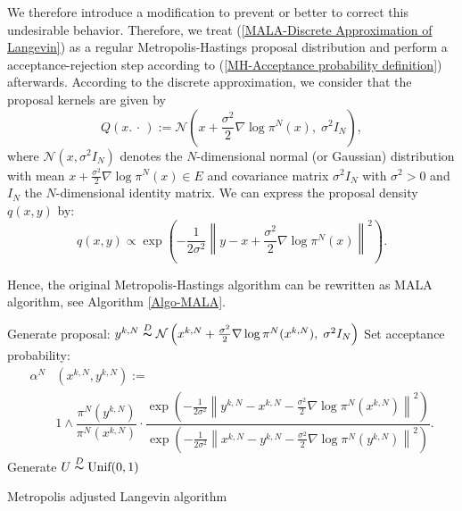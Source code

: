We therefore introduce a modification to prevent or better to correct this undesirable behavior. Therefore, we treat (\ref{MALA-Discrete Approximation of Langevin}) as a regular Metropolis-Hastings proposal distribution and perform a acceptance-rejection step according to (\ref{MH-Acceptance probability definition}) afterwards. According to the discrete approximation, we consider that the proposal kernels are given by
\begin{equation}
\label{MALA-GaussianProposalKernel}
 Q(x. \, \cdot \,) := \mathcal{N}(x + \frac{\sigma^2}{2} \nabla \log \pi^{N} \left( x \right),\; \sigma^2 I_{N} ),
\end{equation}
where $ \mathcal{N}(x, \sigma^2 I_{N} ) $ denotes the $N$-dimensional normal (or Gaussian) distribution with mean $x + \frac{\sigma^2}{2} \nabla \log \pi^{N} \left( x \right) \in E$ and covariance matrix $ \sigma^2 I_{N} $ with $ \sigma^2 > 0 $ and $ I_{N} $ the $N$-dimensional identity matrix. We can express the proposal density $ q(x,y) $ by:
\begin{equation}
 q(x,y)  \varpropto  \exp{ \left( - \frac{ 1}{2 \sigma^2}  \left\| y - x + \frac{\sigma^2}{2} \nabla \log \pi^{N} \left( x \right) \right\|^2 \right) }.
\end{equation}

Hence, the original Metropolis-Hastings algorithm can be rewritten as MALA algorithm, see Algorithm \ref{Algo-MALA}.

\IncMargin{1em}
\begin{algorithm}[htb]
\DontPrintSemicolon


\BlankLine

{
  Generate proposal: $ y^{k,N} \stackrel{D}{\thicksim} \mathcal{N}\left(x^{k,N} + \frac{\sigma^2}{2} \nabla \log \pi^{N}(x^{k,N}), \; \sigma^2 I_N\right) $\;
  Set acceptance probability:
  \begin{align*}
   \alpha^{N} & ( x^{k,N}, y^{k,N} )  := \\ 
   & 1 \wedge  \dfrac{\pi^{N}(y^{k,N}) }{\pi^{N}(x^{k,N})} \cdot
    \dfrac{ \exp{\left( - \frac{1}{2\sigma^2} \left\| y^{k,N} - x^{k,N} - \frac{\sigma^2}{2} \nabla \log \pi^{N}(x^{k,N}) \right\|^2 \right)} }{ \exp{\left( - \frac{1}{2\sigma^2} \left\| x^{k,N} - y^{k,N} - \frac{\sigma^2}{2} \nabla \log \pi^{N}(y^{k,N}) \right\|^2 \right)} }.    
  \end{align*}\label{MALAAlgo-AcceptanceProba}
  Generate $ U \stackrel{D}{\thicksim} \text{Unif}(0,1) $\;

}
\caption{Metropolis adjusted Langevin algorithm}\label{Algo-MALA}
\end{algorithm}\DecMargin{1em}


